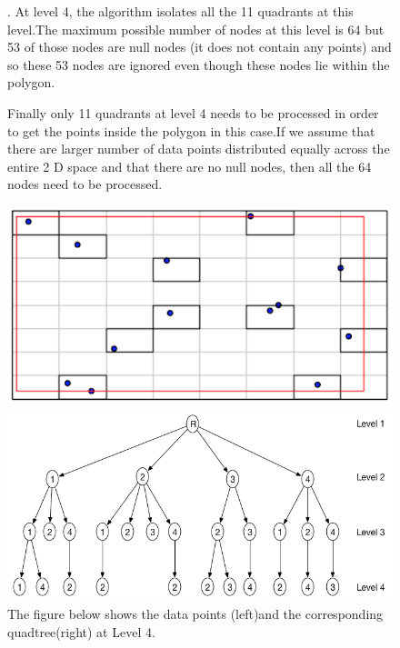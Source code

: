 \documentclass{article}
\begin{document}
\begin{figure}

.
At level 4, the algorithm isolates all the 11 quadrants at this level.The maximum possible number of nodes at this level is 64 but 53 of  those nodes are null nodes (it does not contain any points) and so these 53 nodes are ignored even though these nodes lie within the polygon.

Finally only 11 quadrants at level 4 needs to be processed in order to get the points inside the polygon in this case.If we assume that there are larger number of data points distributed equally across the entire 2 D space and that there are no null nodes, then all the 64 nodes need to be processed.
\caption{The figure below shows the data points (left)and the corresponding quadtree(right) at Level 4.}
  \centering
  \begin{minipage}[b]{0.35\textwidth}
    \includegraphics[width=\textwidth]{4Quad1_4}  
  \end{minipage}
  \hfill
  \begin{minipage}[b]{0.6\textwidth}
    \includegraphics[width=\textwidth]{1_1Quad_4_tree}
  \end{minipage}
\end{figure}
\end{document}
